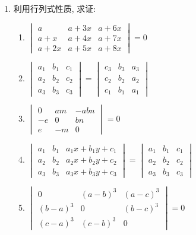 \begin{enumerate}
\item 利用行列式性质, 求证:
\begin{enumerate}
\item $\begin{vmatrix}a & a+3 x & a+6 x \\ a+x & a+4 x & a+7 x \\ a+2 x & a+5 x & a+8 x\end{vmatrix}=0$
\item $\begin{vmatrix}a_{1} & b_{1} & c_{1} \\ a_{2} & b_{2} & c_{2} \\ a_{3} & b_{3} & c_{3}\end{vmatrix}=\begin{vmatrix}c_{3} & b_{3} & a_{3} \\ c_{2} & b_{2} & a_{2} \\ c_{1} & b_{1} & a_{1}\end{vmatrix}$
\item $\begin{vmatrix}0 & a m & -a b n \\ -e & 0 & b n \\ e & -m & 0\end{vmatrix}=0$
\item $\begin{vmatrix}a_{1} & b_{1} & a_{1} x+b_{1} y+c_{1} \\ a_{2} & b_{2} & a_{2} x+b_{2} y+c_{2} \\ a_{3} & b_{3} & a_{3} x+b_{3} y+c_{3}\end{vmatrix}=\begin{vmatrix}a_{1} & b_{1} & c_{1} \\ a_{2} & b_{2} & c_{2} \\ a_{3} & b_{3} & c_{3}\end{vmatrix}$
\item $\begin{vmatrix}0 & (a-b)^{3} & (a-c)^{3} \\ (b-a)^{3} & 0 & (b-c)^{3} \\ (c-a)^{3} & (c-b)^{3} & 0\end{vmatrix}=0$
\end{enumerate}



\end{enumerate}

